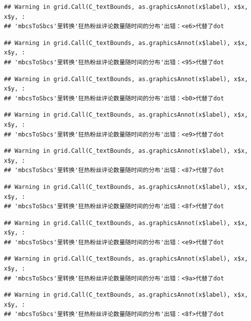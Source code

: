 \documentclass[
]{article}
\begin{document}
\begin{verbatim}
## Warning in grid.Call(C_textBounds, as.graphicsAnnot(x$label), x$x, x$y, :
## 'mbcsToSbcs'里转换'狂热粉丝评论数量随时间的分布'出错：<e6>代替了dot
\end{verbatim}

\begin{verbatim}
## Warning in grid.Call(C_textBounds, as.graphicsAnnot(x$label), x$x, x$y, :
## 'mbcsToSbcs'里转换'狂热粉丝评论数量随时间的分布'出错：<95>代替了dot
\end{verbatim}

\begin{verbatim}
## Warning in grid.Call(C_textBounds, as.graphicsAnnot(x$label), x$x, x$y, :
## 'mbcsToSbcs'里转换'狂热粉丝评论数量随时间的分布'出错：<b0>代替了dot
\end{verbatim}

\begin{verbatim}
## Warning in grid.Call(C_textBounds, as.graphicsAnnot(x$label), x$x, x$y, :
## 'mbcsToSbcs'里转换'狂热粉丝评论数量随时间的分布'出错：<e9>代替了dot
\end{verbatim}

\begin{verbatim}
## Warning in grid.Call(C_textBounds, as.graphicsAnnot(x$label), x$x, x$y, :
## 'mbcsToSbcs'里转换'狂热粉丝评论数量随时间的分布'出错：<87>代替了dot
\end{verbatim}

\begin{verbatim}
## Warning in grid.Call(C_textBounds, as.graphicsAnnot(x$label), x$x, x$y, :
## 'mbcsToSbcs'里转换'狂热粉丝评论数量随时间的分布'出错：<8f>代替了dot
\end{verbatim}

\begin{verbatim}
## Warning in grid.Call(C_textBounds, as.graphicsAnnot(x$label), x$x, x$y, :
## 'mbcsToSbcs'里转换'狂热粉丝评论数量随时间的分布'出错：<e9>代替了dot
\end{verbatim}

\begin{verbatim}
## Warning in grid.Call(C_textBounds, as.graphicsAnnot(x$label), x$x, x$y, :
## 'mbcsToSbcs'里转换'狂热粉丝评论数量随时间的分布'出错：<9a>代替了dot
\end{verbatim}

\begin{verbatim}
## Warning in grid.Call(C_textBounds, as.graphicsAnnot(x$label), x$x, x$y, :
## 'mbcsToSbcs'里转换'狂热粉丝评论数量随时间的分布'出错：<8f>代替了dot
\end{verbatim}
\end{document}
